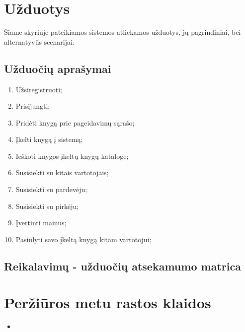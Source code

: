 \documentclass{VUMIFPSkursinis}
\begin{document}
\section{Užduotys}
	Šiame skyriuje pateikiamos sistemos atliekamos užduotys, jų pagrindiniai, bei alternatyvūs scenarijai.
	\subsection{Užduočių aprašymai}
		\begin{enumerate}[label=\textbf{U\arabic*.}]
			\item Užsiregistruoti;		%
			\item Prisijungti;
			\item Pridėti knygą prie pageidavimų sąrašo;
			\item Įkelti knygą į sistemą;
			\item Ieškoti knygos įkeltų knygų kataloge;
			\item Susisiekti su kitais vartotojais;
			\item Susisiekti su pardevėju;
			\item Susisiekti su pirkėju;
			\item Įvertinti mainus; %
			\item Pasiūlyti savo įkeltą knygą kitam vartotojui;
		\end{enumerate}
	\subsection{Reikalavimų - užduočių atsekamumo matrica}

\section{Peržiūros metu rastos klaidos}
	\begin{itemize}
		\item 
	\end{itemize}

	
\setcounter{secnumdepth}{0}
\end{document}
